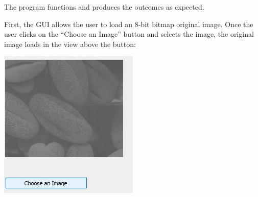 \documentclass{article}
\newenvironment{Figure}
  {\par\medskip\noindent\ignorespaces\minipage{\linewidth}}
  {\endminipage\par\medskip}
\begin{document}
\begin{multicols*}{2}
The program functions and produces the outcomes as expected.

First, the GUI allows the user to load an 8-bit bitmap original image. Once the user clicks on the “Choose an Image” button and selects the image, the original image loads in the view above the button:

\begin{Figure}
 \centering
 \includegraphics[width=\linewidth]{OriginalImage.jpg}
\end{Figure}


\end{multicols*}
\end{document}
